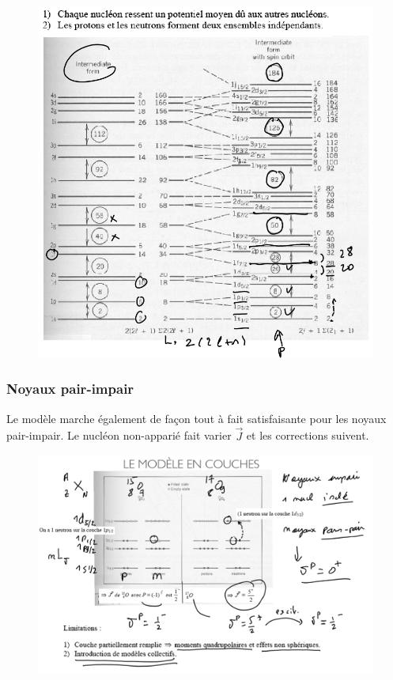 \begin{figure}[H]
    \centering
    \includegraphics[width=\textwidth]{Images4/spin-orbite.PNG}
\end{figure}
\subsubsection{Noyaux pair-impair}
Le modèle marche également de façon tout à fait satisfaisante pour les noyaux pair-impair. Le nucléon non-apparié fait varier $\vec{J}$ et les corrections suivent.
\begin{figure}[H]
    \centering
    \includegraphics[width=\textwidth]{Images4/pair-impair.PNG}
\end{figure}













